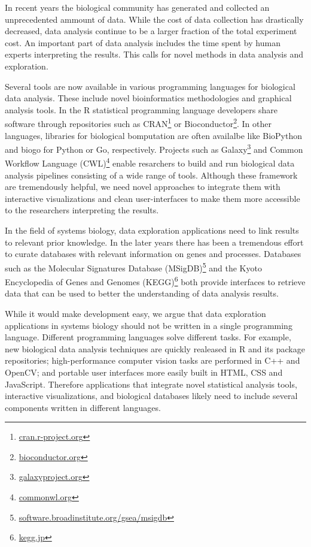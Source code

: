 In recent years the biological community has generated and collected an
unprecedented ammount of data. While the cost of data collection has
drastically decreased, data analysis continue to be a larger fraction of the
total experiment cost.\cite{sboner2011real}  An important part of data analysis
includes the time spent by human experts interpreting the results. This calls
for novel methods in data analysis and exploration. 

Several tools are now available in various programming languages for biological
data analysis. These include novel bioinformatics methodologies and graphical
analysis tools.
In the R statistical programming language developers share software through
repositories such as CRAN\footnote{\url{cran.r-project.org}} or
Bioconductor\footnote{\url{bioconductor.org}}.  In other languages, libraries
for biological bomputation are often availalbe like BioPython\cite{biopython}
and biogo\cite{biogo} for Python or Go, respectively. Projects such as
Galaxy\footnote{\url{galaxyproject.org}} and Common Workflow Language
(CWL)\footnote{\url{commonwl.org}} enable resarchers to build and run
biological data analysis pipelines consisting of a wide range of tools.
Although these framework are tremendously helpful, we need novel approaches
to integrate them with interactive visualizations and clean user-interfaces to
make them more accessible to the researchers interpreting the results. 

In the field of systems biology, data exploration applications need to link
results to relevant prior knowledge. In the later years there has been a
tremendous effort to curate databases with relevant information on genes and
processes. Databases such as the Molecular Signatures Database
(MSigDB)\footnote{\url{software.broadinstitute.org/gsea/msigdb}} and the Kyoto
Encyclopedia of Genes and Genomes (KEGG)\footnote{\url{kegg.jp}} both provide
interfaces to retrieve data that can be used to better the understanding of
data analysis results. 

While it would make development easy, we argue that data exploration
applications in systems biology should not be written in a single programming
language.  Different programming languages solve different tasks.  For example,
new biological data analysis techniques are quickly realeased in R and its
package repositories; high-performance computer vision tasks are performed in
C++ and OpenCV; and portable user interfaces more easily built in HTML, CSS and
JavaScript.  Therefore applications that integrate novel statistical analysis
tools, interactive visualizations, and biological databases likely need to
include several components written in different languages. 

